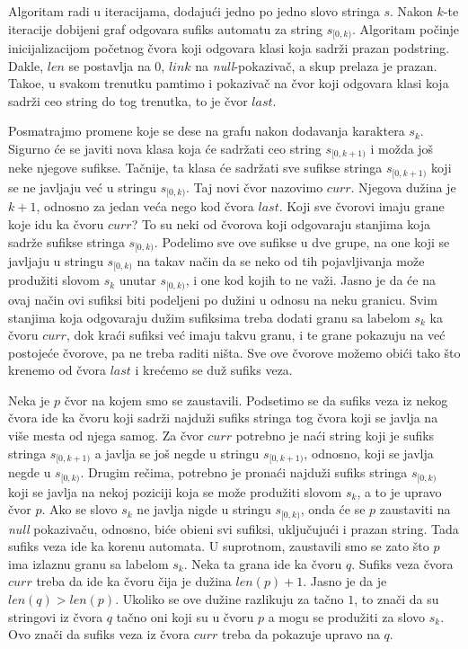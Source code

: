 Algoritam radi u iteracijama, dodaju\' ci jedno po jedno slovo stringa $s$. Nakon $k$-te iteracije dobijeni graf odgovara sufiks automatu za string $s_{[0, k)}$. Algoritam po\v cinje inicijalizacijom po\v cetnog \v cvora koji odgovara klasi koja sadr\v zi prazan podstring. Dakle, $len$ se postavlja na $0$, $link$ na \textit{null}-pokaziva\v c, a skup prelaza je prazan. Tako\dj e, u svakom trenutku pamtimo i pokaziva\v c na \v cvor koji odgovara klasi koja sadr\v zi ceo string do tog trenutka, to je \v cvor $last$.

Posmatrajmo promene koje se dese na grafu nakon dodavanja karaktera $s_k$. Sigurno \' ce se javiti nova klasa koja \' ce sadr\v zati ceo string $s_{[0, k+1)}$ i mo\v zda jo\v s neke njegove sufikse. Ta\v cnije, ta klasa \' ce sadr\v zati sve sufikse stringa $s_{[0, k+1)}$ koji se ne javljaju ve\' c u stringu $s_{[0, k)}$. Taj novi \v cvor nazovimo $curr$. Njegova du\v zina je $k+1$, odnosno za jedan ve\' ca nego kod \v cvora $last$. Koji sve \v cvorovi imaju grane koje idu ka \v cvoru $curr$? To su neki od \v cvorova koji odgovaraju stanjima koja sadr\v ze sufikse stringa $s_{[0,k)}$. Podelimo sve ove sufikse u dve grupe, na one koji se javljaju u stringu $s_{[0,k)}$ na takav na\v cin da se neko od tih pojavljivanja mo\v ze produ\v ziti slovom $s_k$ unutar $s_{[0,k)}$, i one kod kojih to ne va\v zi. Jasno je da \' ce na ovaj na\v cin ovi sufiksi biti podeljeni po du\v zini u odnosu na neku granicu. Svim stanjima koja odgovaraju du\v zim sufiksima treba dodati granu sa labelom $s_k$ ka \v cvoru $curr$, dok kra\' ci sufiksi ve\' c imaju takvu granu, i te grane pokazuju na ve\' c postoje\' ce \v cvorove, pa ne treba raditi ni\v sta. Sve ove \v cvorove mo\v zemo obi\' ci tako \v sto krenemo od \v cvora $last$ i kre\' cemo se du\v z sufiks veza.

Neka je $p$ \v cvor na kojem smo se zaustavili. Podsetimo se da sufiks veza iz nekog \v cvora ide ka \v cvoru koji sadr\v zi najdu\v zi sufiks stringa tog \v cvora koji se javlja na vi\v se mesta od njega samog. Za \v cvor $curr$ potrebno je na\' ci string koji je sufiks stringa $s_{[0,k+1)}$ a javlja se jo\v s negde u stringu $s_{[0,k+1)}$, odnosno, koji se javlja negde u $s_{[0,k)}$. Drugim re\v cima, potrebno je prona\' ci najdu\v zi sufiks stringa $s_{[0,k)}$ koji se javlja na nekoj poziciji koja se mo\v ze produ\v ziti slovom $s_k$, a to je upravo \v cvor $p$. Ako se slovo $s_k$ ne javlja nigde u stringu $s_{[0,k)}$, onda \' ce se $p$ zaustaviti na \textit{null} pokaziva\v cu, odnosno, bi\' ce obi\dj eni svi sufiksi, uklju\v cuju\' ci i prazan string.  Tada sufiks veza ide ka korenu automata. U suprotnom, zaustavili smo se zato \v sto $p$ ima izlaznu granu sa labelom $s_k$. Neka ta grana ide ka \v cvoru $q$. Sufiks veza \v cvora $curr$ treba da ide ka \v cvoru \v cija je du\v zina $len(p)+1$. Jasno je da je $len(q) > len(p)$. Ukoliko se ove du\v zine razlikuju za ta\v cno $1$, to zna\v ci da su stringovi iz \v cvora $q$ ta\v cno oni koji su u \v cvoru $p$ a mogu se produ\v ziti za slovo $s_k$. Ovo zna\v ci da sufiks veza iz \v cvora $curr$ treba da pokazuje upravo na $q$.

